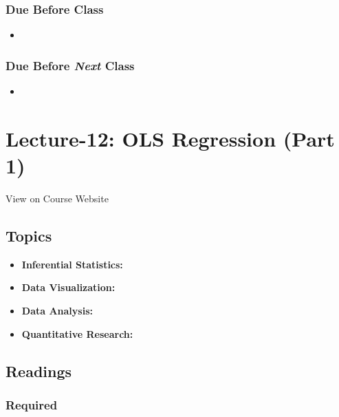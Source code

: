 \documentclass[]{book}
\providecommand{\tightlist}{%
  \setlength{\itemsep}{0pt}\setlength{\parskip}{0pt}}
\theoremstyle{definition}
\theoremstyle{definition}
\theoremstyle{definition}
\theoremstyle{remark}
\begin{document}
\subsubsection*{Due Before Class}\label{due-before-class-10}

\begin{itemize}
\item
\end{itemize}

\subsubsection*{\texorpdfstring{Due Before \emph{Next}
Class}{Due Before Next Class}}\label{due-before-next-class-11}

\begin{itemize}
\item
\end{itemize}

\section{Lecture-12: OLS Regression (Part
1)}\label{lecture-12-ols-regression-part-1}

View on Course Website

\subsection*{Topics}\label{topics-12}

\begin{itemize}
\tightlist
\item
  \textbf{Inferential Statistics:}
\item
  \textbf{Data Visualization:}
\item
  \textbf{Data Analysis:}
\item
  \textbf{Quantitative Research:}
\end{itemize}

\subsection*{Readings}\label{readings-13}

\subsubsection*{Required}\label{required-12}
\end{document}
